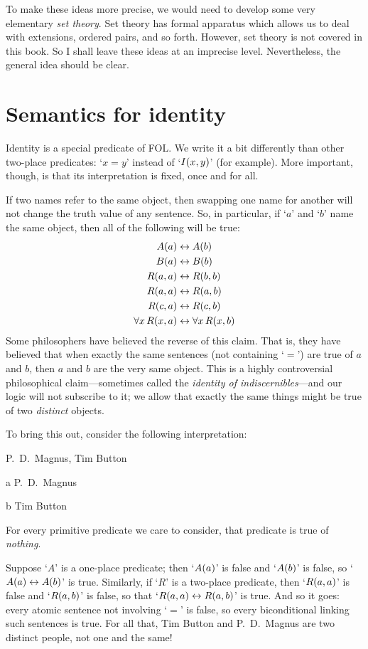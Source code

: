To make these ideas more precise, we would need to develop some very elementary \emph{set theory}. Set theory has formal apparatus which allows us to deal with extensions, ordered pairs, and so forth. However, set theory is not covered in this book. So I shall leave these ideas at an imprecise level. Nevertheless, the general idea should be clear.


\section{Semantics for identity}
Identity is a special predicate of FOL. We write it a bit differently than other two-place predicates: `$x=y$' instead of `$\mathord{I}(x,y)$' (for example). More important, though, is that its interpretation is fixed, once and for all.

If two names refer to the same object, then swapping one name for another will not change the truth value of any sentence. So, in particular, if `$a$' and `$b$' name the same object, then all of the following will be true:\label{model.nonidentity}
	\begin{align*}
	 	\mathord{A}(a) &\leftrightarrow \mathord{A}(b) \\
	 	\mathord{B}(a) &\leftrightarrow \mathord{B}(b)\\
		\mathord{R}(a,a) &\leftrightarrow \mathord{R}(b,b)\\
		\mathord{R}(a,a) & \leftrightarrow \mathord{R}(a,b)\\
		\mathord{R}(c,a) &\leftrightarrow \mathord{R}(c,b)\\
		\forall x\, \mathord{R}(x,a) &\leftrightarrow \forall x\, \mathord{R}(x,b)
	\end{align*}
Some philosophers have believed the reverse of this claim. That is, they have believed that when exactly the same sentences (not containing `$=$') are true of $a$ and $b$, then $a$ and $b$ are the very same object. This is a highly controversial philosophical claim---sometimes called the \emph{identity of indiscernibles}---and our logic will not subscribe to it; we allow that exactly the same things might be true of two \emph{distinct} objects.  

To bring this out, consider the following interpretation:
	\begin{ekey}
		\item[\text{domain}] P.~D.\ Magnus, Tim Button
		\item[a] P.~D.\ Magnus
		\item[b] Tim Button
		\item[\atom{\metav{R}}{x_1,\dots, x_n}] For every primitive
		predicate  we care to consider, that predicate is true of
		\emph{nothing}.
	\end{ekey}
Suppose `$A$' is a one-place predicate; then `$\mathord{A}(a)$' is false and `$\mathord{A}(b)$' is false, so `$\mathord{A}(a) \leftrightarrow \mathord{A}(b)$' is true. Similarly, if `$R$' is a two-place predicate, then `$\mathord{R}(a,a)$' is false and `$\mathord{R}(a,b)$' is false, so that `$\mathord{R}(a,a) \leftrightarrow \mathord{R}(a,b)$' is true. And so it goes: every atomic sentence not involving `$=$' is false, so every biconditional linking such sentences is true. For all that, Tim Button and P.~D.\ Magnus are two distinct people, not one and the same!

